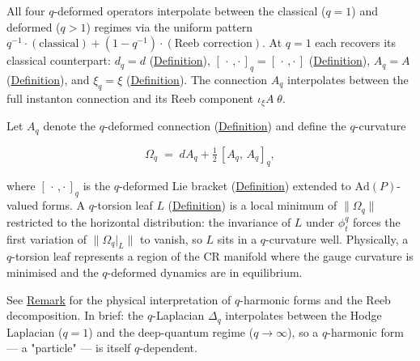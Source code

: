 \begin{remark}
  \label{rem:classical-recovery}
All four $q$-deformed operators interpolate between the classical ($q = 1$)
and deformed ($q > 1$) regimes via the uniform pattern
$q^{-1} \cdot (\text{classical}) + (1 - q^{-1}) \cdot (\text{Reeb correction})$.
At $q = 1$ each recovers its classical counterpart:
$d_q = d$ (\hyperref[def:q-ext-deriv]{Definition}),
$[\,\cdot\,,\cdot\,]_q = [\,\cdot\,,\cdot\,]$
(\hyperref[def:q-lie-bracket]{Definition}),
$A_q = A$ (\hyperref[def:q-connection]{Definition}), and
$\xi_q = \xi$ (\hyperref[def:q-reeb-vector-field]{Definition}).
The connection $A_q$ interpolates between the full instanton connection and
its Reeb component $\iota_\xi A\;\theta$.
\end{remark}

\begin{remark}
  \label{rem:q-torsion-leaf-minimum}
Let $A_q$ denote the $q$-deformed connection
(\hyperref[def:q-connection]{Definition}) and define the $q$-curvature

\[
\Omega_q \;=\; dA_q + \tfrac{1}{2}\,[A_q,\, A_q]_q,
\]

where $[\,\cdot\,,\cdot\,]_q$ is the $q$-deformed Lie bracket
(\hyperref[def:q-lie-bracket]{Definition}) extended to $\mathrm{Ad}(P)$-valued
forms. A $q$-torsion leaf $L$ (\hyperref[def:q-torsion-leaf]{Definition}) is a
local minimum of $\lVert\Omega_q\rVert$ restricted to the horizontal
distribution: the invariance of $L$ under $\phi_t^q$ forces the first
variation of $\lVert\Omega_q|_L\rVert$ to vanish, so $L$ sits in a
$q$-curvature well. Physically, a $q$-torsion leaf represents a region of
the CR manifold where the gauge curvature is minimised and the $q$-deformed
dynamics are in equilibrium.
\end{remark}

\begin{remark}
  \label{rem:q-harmonic-physical}
See \hyperref[rem:reeb-physical]{Remark} for the physical interpretation of
$q$-harmonic forms and the Reeb decomposition. In brief: the
$q$-Laplacian $\Delta_q$ interpolates between the Hodge Laplacian
($q = 1$) and the deep-quantum regime ($q \to \infty$), so a
$q$-harmonic form --- a "particle" --- is itself $q$-dependent.
\end{remark}

